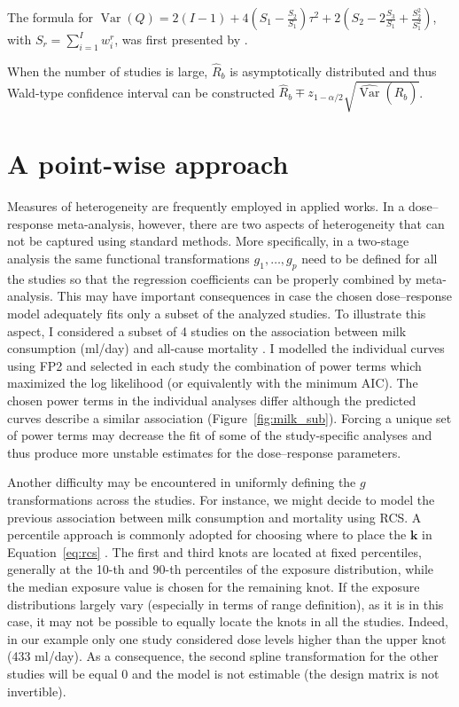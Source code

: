 \documentclass[11pt,a4paper,twoside,openany]{book}\usepackage{knitr}
\DeclareMathOperator{\Var}{Var}
\begin{document}
{{\noindent The formula for $\Var(Q) = 2(I-1) + 4\left(S_1 - \frac{S_2}{S_1}\right)\tau^2 + 2\left(S_2 - 2\frac{S_3}{S_1} + \frac{S_2^2}{S_1^2} \right)$, with $S_r = \sum_{i = 1}^I w_i^r$, was first presented by \cite{ biggerstaff1997incorporating}.

\noindent When the number of studies is large, $\hat R_b$ is asymptotically distributed and thus Wald-type confidence interval can be constructed $\hat R_b \mp z_{1-\alpha/2} \sqrt{ \widehat{\Var} \left(\hat R_b \right)}$.



\section{A point-wise approach}\label{sec:pwa}



Measures of heterogeneity are frequently employed in applied works. In a dose--response meta-analysis, however, there are two aspects of heterogeneity that can not be captured using standard methods. More specifically, in a two-stage analysis the same functional transformations $g_1, \dots, g_p$ need to be defined for all the studies so that the regression coefficients can be properly combined by meta-analysis.
This may have important consequences in case the chosen dose--response model adequately fits only a subset of the analyzed studies. To illustrate this aspect, I considered a subset of 4 studies on the association between milk consumption (ml/day) and all-cause mortality \citep{larsson2015milk}. I modelled the individual curves using FP2 and selected in each study the combination of power terms which maximized the log likelihood (or equivalently with the minimum AIC). The chosen power terms in the individual analyses differ although the predicted curves describe a similar association (Figure~\ref{fig:milk_sub}). Forcing a unique set of power terms may decrease the fit of some of the study-specific analyses and thus produce more unstable estimates for the dose--response parameters.

\noindent Another difficulty may be encountered in uniformly defining the $g$ transformations across the studies. For instance, we might decide to model the previous association between milk consumption and mortality using RCS. A percentile approach is commonly adopted for choosing where to place the $\mathbf{k}$ in Equation~\ref{eq:rcs} \citep{harrell2013regression}. The first and third knots are located at fixed percentiles, generally at the 10-th and 90-th percentiles of the exposure distribution, while the median exposure value is chosen for the remaining knot.
If the exposure distributions largely vary (especially in terms of range definition), as it is in this case, it may not be possible to equally locate the knots in all the studies. Indeed, in our example only one study considered dose levels higher than the upper knot (433 ml/day). As a consequence, the second spline transformation for the other studies will be equal 0 and the model is not estimable (the design matrix is not invertible). 

}}
\end{document}
